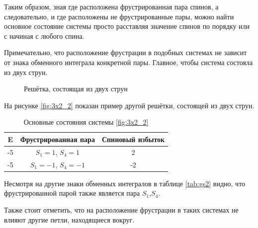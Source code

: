 \documentclass[utf8, babel, sor, jor, amsmath,amssymb, reprint]{elsarticle} %
\begin{document}
Таким образом, зная где расположена фрустрированная пара спинов, а следовательно, и где расположены не фрустрированные пары, можно найти основное состояние системы просто расставляя значение спинов по порядку или с начиная с любого спина. 

Примечательно, что расположение фрустрации в подобных системах не зависит от знака обменного интеграла конкретной пары. Главное, чтобы система состояла из двух струн.

\begin{figure}[h]
	\centering
	\caption{Решётка, состоящая из двух струн}
	\label{fig:3x2_2}
\end{figure}

На рисунке \eqref{fig:3x2_2} показан пример другой решётки, состоящей из двух струн.

\begin{table}[h]
	\centering
	\begin{tabular}{|c|c|c|}
		\hline
		E   &   Фрустрированная пара & Спиновый избыток \\
		\hline
		-5   &  $S_1=1$, $S_4=1$ & 2 \\
		\hline
		-5   &   $S_1=-1$, $S_4=-1$ & -2 \\
		\hline
	\end{tabular}
	\caption{Основные состояния системы \eqref{fig:3x2_2}}
	\label{tab:gs2}
\end{table}

Несмотря на другие знаки обменных интегралов в таблице \eqref{tab:gs2} видно, что фрустрированной парой также является пара $S_1$,$S_4$.

Также стоит отметить, что на расположение фрустрации в таких системах  не влияют другие петли, находящиеся вокруг.
\end{document}
